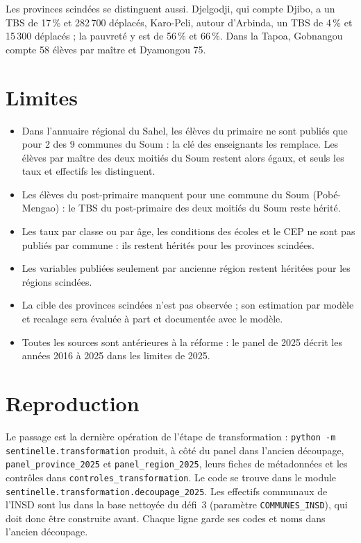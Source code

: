 \documentclass{article}
\begin{document}
Les provinces scindées se distinguent aussi. Djelgodji, qui compte Djibo, a un TBS de 17\,\% et 282\,700 déplacés, Karo-Peli, autour d'Arbinda, un TBS de 4\,\% et 15\,300 déplacés ; la pauvreté y est de 56\,\% et 66\,\%. Dans la Tapoa, Gobnangou compte 58 élèves par maître et Dyamongou 75.

\section{Limites}

\begin{itemize}
\item Dans l'annuaire régional du Sahel, les élèves du primaire ne sont publiés que pour 2 des 9 communes du Soum : la clé des enseignants les remplace. Les élèves par maître des deux moitiés du Soum restent alors égaux, et seuls les taux et effectifs les distinguent.
\item Les élèves du post-primaire manquent pour une commune du Soum (Pobé-Mengao) : le TBS du post-primaire des deux moitiés du Soum reste hérité.
\item Les taux par classe ou par âge, les conditions des écoles et le CEP ne sont pas publiés par commune : ils restent hérités pour les provinces scindées.
\item Les variables publiées seulement par ancienne région restent héritées pour les régions scindées.
\item La cible des provinces scindées n'est pas observée ; son estimation par modèle et recalage sera évaluée à part et documentée avec le modèle.
\item Toutes les sources sont antérieures à la réforme : le panel de 2025 décrit les années 2016 à 2025 dans les limites de 2025.
\end{itemize}

\section{Reproduction}

Le passage est la dernière opération de l'étape de transformation : \texttt{python -m sentinelle.transformation} produit, à côté du panel dans l'ancien découpage, \texttt{panel\_province\_2025} et \texttt{panel\_region\_2025}, leurs fiches de métadonnées et les contrôles dans \texttt{controles\_transformation}. Le code se trouve dans le module \texttt{sentinelle.transformation.decoupage\_2025}. Les effectifs communaux de l'INSD sont lus dans la base nettoyée du défi~3 (paramètre \texttt{COMMUNES\_INSD}), qui doit donc être construite avant. Chaque ligne garde ses codes et noms dans l'ancien découpage.



\end{document}
